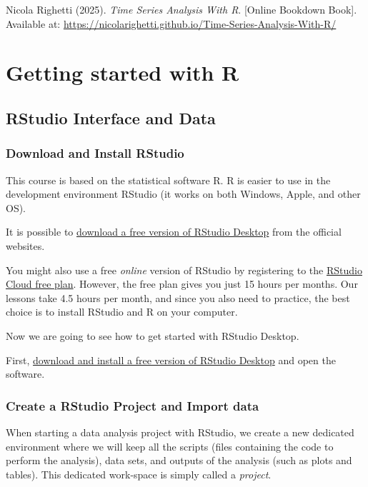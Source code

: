 \documentclass[
]{article}
\begin{document}
Nicola Righetti (2025). \emph{Time Series Analysis With R}. {[}Online Bookdown Book{]}. Available at: \url{https://nicolarighetti.github.io/Time-Series-Analysis-With-R/}

\section{Getting started with R}\label{getting-started-with-r}

\subsection{RStudio Interface and Data}\label{rstudio-interface-and-data}

\subsubsection{Download and Install RStudio}\label{download-and-install-rstudio}

This course is based on the statistical software R. R is easier to use in the development environment RStudio (it works on both Windows, Apple, and other OS).

It is possible to \href{https://rstudio.com/products/rstudio/download/}{download a free version of RStudio Desktop} from the official websites.

You might also use a free \emph{online} version of RStudio by registering to the \href{https://rstudio.cloud}{RStudio Cloud free plan}. However, the free plan gives you just 15 hours per months. Our lessons take 4.5 hours per month, and since you also need to practice, the best choice is to install RStudio and R on your computer.

Now we are going to see how to get started with RStudio Desktop.

First, \href{https://rstudio.com/products/rstudio/download/}{download and install a free version of RStudio Desktop} and open the software.

\subsubsection{Create a RStudio Project and Import data}\label{create-a-rstudio-project-and-import-data}

When starting a data analysis project with RStudio, we create a new dedicated environment where we will keep all the scripts (files containing the code to perform the analysis), data sets, and outputs of the analysis (such as plots and tables). This dedicated work-space is simply called a \emph{project}.
\end{document}
